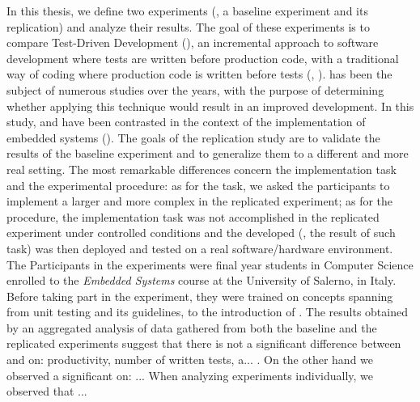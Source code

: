 In this thesis, we define two experiments (\ie, a baseline experiment and its replication) and analyze their results. The goal of these experiments is to compare Test-Driven Development (\tdd), an incremental approach to software development where tests are written before production code, with a traditional way of coding where production code is written before tests (\ie, \notdd). \tdd has been the subject of numerous studies over the years, with the purpose of determining whether applying this technique would result in an improved development. In this study, \tdd and \notdd have been contrasted in the context of the implementation of embedded systems (\ess). The goals of the replication study are to validate the results of the baseline experiment and to generalize them to a different and more real setting. The most remarkable differences concern the implementation task and the experimental procedure: as for the task, we asked the participants to implement a larger and more complex \es in the replicated experiment; as for the procedure, the implementation task was not accomplished in the replicated experiment under controlled conditions and the developed \es (\ie, the result of such task) was then deployed and tested on a real software/hardware environment.  
The Participants in the experiments were final year students in Computer Science enrolled to the \textit{Embedded Systems} course at the University of Salerno, in Italy. Before taking part in the experiment, they were trained on concepts spanning from unit testing and its guidelines, to the introduction of \tdd.
The results obtained by an aggregated analysis of data gathered from both the baseline and the replicated experiments suggest that there is not a significant difference between \tdd and \notdd on: productivity, number of written tests, a... . On the other hand we observed a significant  on: ... When analyzing experiments individually, we observed that ... 